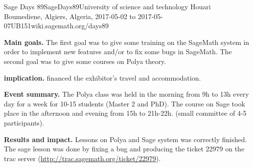 \begin{event}{Sage Days 89}{SageDays89}{University of science and technology Houari Boumediene, Algiers, Algeria, 2017-05-02 to 2017-05-07}{UB}{15}{1}{wiki.sagemath.org/days89}

\textbf{Main goals.} The first goal was to give some training on the SageMath system in order to implement new features  and/or to fix some bugs in SageMath. The second goal was to give some courses on Polya theory.

\textbf{\ODK implication.}
\ODK financed the exhibitor's travel and accommodation.

\textbf{Event summary.}
The Polya class was held in the morning from 9h to 13h every day for a week
for 10-15 students (Master 2 and PhD).
The course on Sage took place in the afternoon and evening from 15h to 21h-22h. (small committee of 4-5 participants).

\textbf{Results and impact.} Lessons on Polya and Sage system was correctly finished. The sage lesson was done by fixing a bug and producing the ticket 22979 on the trac server (\url{http://trac.sagemath.org/ticket/22979}).

\end{event}


